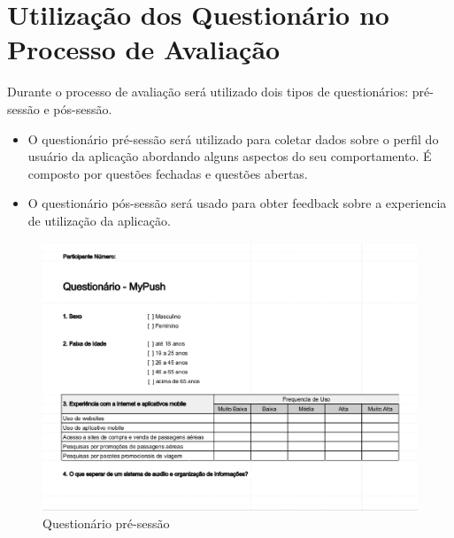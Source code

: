 \nocite{FILARDI_TRAINA_2008}

\section{Utilização dos Questionário no Processo de Avaliação}

Durante o processo de avaliação será utilizado dois tipos de questionários: pré-sessão e pós-sessão.
\begin{itemize}
	\item O questionário pré-sessão será utilizado para coletar dados sobre o perfil do usuário da aplicação abordando alguns aspectos do seu comportamento. É composto por questões fechadas e questões abertas.
	\item O questionário pós-sessão será usado para obter feedback sobre a experiencia de utilização da aplicação.
\end{itemize}

\begin{figure}[h]
	\centering
	\includegraphics[scale=0.5]{figuras/questionario_pre-sessao.eps}
	\caption{Questionário pré-sessão}
\end{figure}
